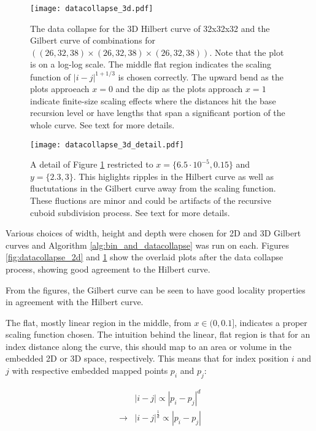 \begin{figure}[h]
  \centering
  \label{fig:datacollapse_3d}
  \texttt{[image: datacollapse\_3d.pdf]}
  \caption{ The data collapse for the 3D Hilbert curve of 32x32x32 and the Gilbert curve of combinations for $((26,32,38) \times (26,32,38) \times (26,32,38))$. 
  Note that the plot is on a log-log scale.
  The middle flat region indicates the scaling function of $|i-j|^{1 + 1/3}$ is chosen correctly.
  The upward bend as the plots approeach $x=0$ and the dip as the plots approach $x=1$ indicate finite-size scaling effects where the distances
  hit the base recursion level or have lengths that span a significant portion of the whole curve.
  See text for more details.
  }
\end{figure}

\begin{figure}[h]
  \centering
  \label{fig:datacollapse_3d_detail}
  \texttt{[image: datacollapse\_3d\_detail.pdf]}
  \caption{ A detail of Figure \ref{fig:datacollapse_3d} restricted to $x = \{6.5 \cdot 10^{-5}, 0.15\}$ and $y = \{2.3,3\}$.
  This higlights ripples in the Hilbert curve as well as fluctutations in the Gilbert curve away from the scaling function.
  These fluctions are minor and could be artifacts of the recursive cuboid subdivision process.
  See text for more details.
  }
\end{figure}

Various choices of width, height and depth were chosen for 2D and 3D Gilbert curves and
Algorithm \ref{alg:bin_and_datacollapse} was run on each.
Figures \ref{fig:datacollapse_2d} and \ref{fig:datacollapse_3d} show the overlaid plots
after the data collapse process, showing good agreement to the Hilbert curve.

From the figures, the Gilbert curve can be seen to have good locality properties in
agreement with the Hilbert curve.

The flat, mostly linear region in the middle, from $x \in (0, 0.1]$, indicates a proper scaling
function chosen.
The intuition behind the linear, flat region is that for an index distance along the curve,
this should map to an area or volume in the embedded 2D or 3D space, respectively.
This means that for index position $i$ and $j$ with respective embedded mapped points $p_i$ and $p_j$:

$$
\begin{array}{ll}
  & |i-j| \propto |p_i - p_j|^d \\
  \to & |i-j|^{\frac{1}{d}} \propto |p_i - p_j| \\
\end{array}
$$

